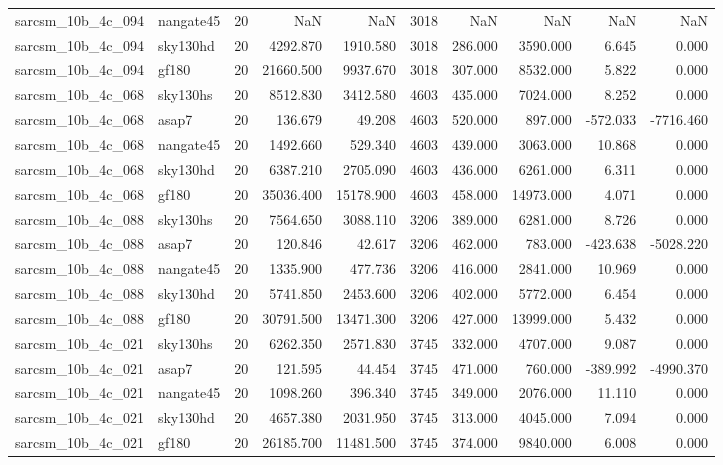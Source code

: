 \documentclass{article}
\begin{document}
\begin{longtable}{llrrrrrrrr}
sarcsm\_10b\_4c\_094 & nangate45 & 20 & NaN & NaN & 3018 & NaN & NaN & NaN & NaN \\
sarcsm\_10b\_4c\_094 & sky130hd & 20 & 4292.870 & 1910.580 & 3018 & 286.000 & 3590.000 & 6.645 & 0.000 \\
sarcsm\_10b\_4c\_094 & gf180 & 20 & 21660.500 & 9937.670 & 3018 & 307.000 & 8532.000 & 5.822 & 0.000 \\
sarcsm\_10b\_4c\_068 & sky130hs & 20 & 8512.830 & 3412.580 & 4603 & 435.000 & 7024.000 & 8.252 & 0.000 \\
sarcsm\_10b\_4c\_068 & asap7 & 20 & 136.679 & 49.208 & 4603 & 520.000 & 897.000 & -572.033 & -7716.460 \\
sarcsm\_10b\_4c\_068 & nangate45 & 20 & 1492.660 & 529.340 & 4603 & 439.000 & 3063.000 & 10.868 & 0.000 \\
sarcsm\_10b\_4c\_068 & sky130hd & 20 & 6387.210 & 2705.090 & 4603 & 436.000 & 6261.000 & 6.311 & 0.000 \\
sarcsm\_10b\_4c\_068 & gf180 & 20 & 35036.400 & 15178.900 & 4603 & 458.000 & 14973.000 & 4.071 & 0.000 \\
sarcsm\_10b\_4c\_088 & sky130hs & 20 & 7564.650 & 3088.110 & 3206 & 389.000 & 6281.000 & 8.726 & 0.000 \\
sarcsm\_10b\_4c\_088 & asap7 & 20 & 120.846 & 42.617 & 3206 & 462.000 & 783.000 & -423.638 & -5028.220 \\
sarcsm\_10b\_4c\_088 & nangate45 & 20 & 1335.900 & 477.736 & 3206 & 416.000 & 2841.000 & 10.969 & 0.000 \\
sarcsm\_10b\_4c\_088 & sky130hd & 20 & 5741.850 & 2453.600 & 3206 & 402.000 & 5772.000 & 6.454 & 0.000 \\
sarcsm\_10b\_4c\_088 & gf180 & 20 & 30791.500 & 13471.300 & 3206 & 427.000 & 13999.000 & 5.432 & 0.000 \\
sarcsm\_10b\_4c\_021 & sky130hs & 20 & 6262.350 & 2571.830 & 3745 & 332.000 & 4707.000 & 9.087 & 0.000 \\
sarcsm\_10b\_4c\_021 & asap7 & 20 & 121.595 & 44.454 & 3745 & 471.000 & 760.000 & -389.992 & -4990.370 \\
sarcsm\_10b\_4c\_021 & nangate45 & 20 & 1098.260 & 396.340 & 3745 & 349.000 & 2076.000 & 11.110 & 0.000 \\
sarcsm\_10b\_4c\_021 & sky130hd & 20 & 4657.380 & 2031.950 & 3745 & 313.000 & 4045.000 & 7.094 & 0.000 \\
sarcsm\_10b\_4c\_021 & gf180 & 20 & 26185.700 & 11481.500 & 3745 & 374.000 & 9840.000 & 6.008 & 0.000 \\

\end{longtable}
\end{document}
